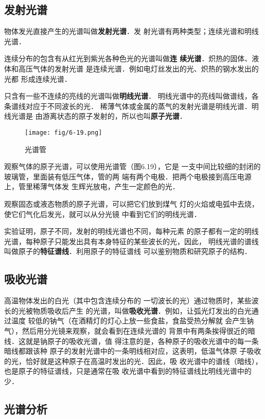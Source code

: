 \subsection{发射光谱}

物体发光直接产生的光谱叫做\textbf{发射光谱}．发
射光谱有两种类型；连续光谱和明线光谱．

连续分布的包含有从红光到紫光各种色光的光谱叫做\textbf{连
续光谱}．炽热的固体、液体和高压气体的发射光谱
是连续光谱．例如电灯丝发出的光、炽热的钢水发出的光都
形成连续光谱．

只含有一些不连续的亮线的光谱叫做\textbf{明线光谱}．
明线光谱中的亮线叫做谱线，各条谱线对应于不同波长的光．
稀薄气体或金属的蒸气的发射光谱是明线光谱．明线光谱是
由游离状态的原子发射的，所以也叫\textbf{原子光谱}．
\begin{figure}[htp]\centering
    \texttt{[image: fig/6-19.png]}
    \caption{光谱管}
    \end{figure}

观察气体的原子光谱，可以使用光谱管（图6.19），它是
一支中间比较细的封闭的玻璃管，里面装有低压气体，管的两
端有两个电极．把两个电极接到高压电源上，管里稀薄气体发
生辉光放电，产生一定颜色的光．

观察固态或液态物质的原子光谱，可以把它们放到煤气
灯的火焰或电弧中去烧，使它们气化后发光，就可以从分光镜
中看到它们的明线光谱．

实验证明，原子不同，发射的明线光谱也不同，每种元素
的原子都有一定的明线光谱，每种原子只能发出具有本身特征的某些波长的光，因此，
明线光谱的谱线叫做原子的\textbf{特征谱线}．利用原子的特征谱线
可以鉴别物质和研究原子的结构．

\subsection{吸收光谱}
高温物体发出的白光（其中包含连续分布的
一切波长的光）通过物质时，某些波长的光被物质吸收后产生
的光谱，叫做\textbf{吸收光谱}．例如，让弧光灯发出的白光通过温度
较低的钠气（在酒精灯的灯心上放一些食盐，食盐受热分解就
会产生钠气），然后用分光镜来观察，就会看到在连续光谱的
背景中有两条挨得很近的暗线．这就是钠原子的吸收光谱，值
得注意的是，各种原子的吸收光谱中的每一条暗线都跟该种
原子的发射光谱中的一条明线相对应，这表明，低温气体原
子吸收的光，恰好就是这种原子在高温时发出的光．因此，吸
收光谱中的谱线（暗线），也是原子的特征谱线，只是通常在吸
收光谱中看到的特征谱线比明线光谱中的少．

\subsection{光谱分析}

